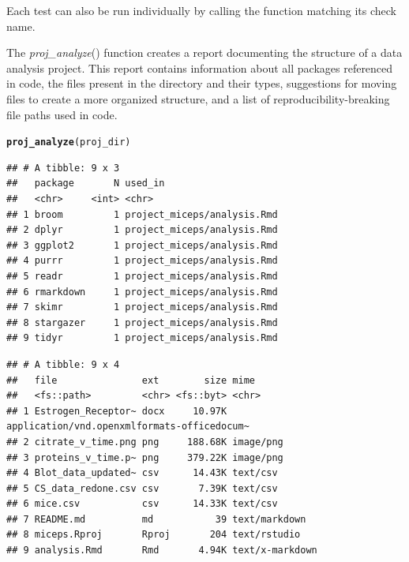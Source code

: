 \documentclass[APA,LATO1COL]{WileyNJD-v2}\usepackage[]{graphicx}\usepackage[]{color}
\makeatletter
\newcommand{\hlstd}[1]{\textcolor[rgb]{0.345,0.345,0.345}{#1}}%
\newcommand{\hlkwd}[1]{\textcolor[rgb]{0.737,0.353,0.396}{\textbf{#1}}}%
\newenvironment{kframe}{%
 \def\at@end@of@kframe{}%
 \ifinner\ifhmode%
  \def\at@end@of@kframe{\end{minipage}}%
  \begin{minipage}{\columnwidth}%
 \fi\fi%
 \def\FrameCommand##1{\hskip\@totalleftmargin \hskip-\fboxsep
 \colorbox{shadecolor}{##1}\hskip-\fboxsep
     \hskip-\linewidth \hskip-\@totalleftmargin \hskip\columnwidth}%
 \MakeFramed {\advance\hsize-\width
   \@totalleftmargin\z@ \linewidth\hsize
   \@setminipage}}%
 {\par\unskip\endMakeFramed%
 \at@end@of@kframe}
\newenvironment{knitrout}{}{} %
\newcommand{\func}[1]{\textit{#1}()}
\makeatother
\begin{document}
Each test can also be run individually by calling the function matching its check name.

The \func{proj\_analyze} function creates a report documenting the structure of a data analysis project. This report contains information about all packages referenced in code, the files present in the directory and their types, suggestions for moving files to create a more organized structure, and a list of reproducibility-breaking file paths used in code.

\begin{knitrout}
\color{fgcolor}\begin{kframe}
\begin{alltt}
\hlkwd{proj_analyze}\hlstd{(proj_dir)}
\end{alltt}


{\ttfamily\noindent\itshape\color{messagecolor}{\#\# -- Analysis of reproducibility for project\_miceps ---------------------- fertile 0.0.0.9028 --}}

{\ttfamily\noindent\itshape\color{messagecolor}{\#\# --\ \  Packages referenced in source code -------------------------------- fertile 0.0.0.9028 --}}\begin{verbatim}
## # A tibble: 9 x 3
##   package       N used_in                    
##   <chr>     <int> <chr>                      
## 1 broom         1 project_miceps/analysis.Rmd
## 2 dplyr         1 project_miceps/analysis.Rmd
## 3 ggplot2       1 project_miceps/analysis.Rmd
## 4 purrr         1 project_miceps/analysis.Rmd
## 5 readr         1 project_miceps/analysis.Rmd
## 6 rmarkdown     1 project_miceps/analysis.Rmd
## 7 skimr         1 project_miceps/analysis.Rmd
## 8 stargazer     1 project_miceps/analysis.Rmd
## 9 tidyr         1 project_miceps/analysis.Rmd
\end{verbatim}


{\ttfamily\noindent\itshape\color{messagecolor}{\#\# --\ \  Files present in directory ---------------------------------------- fertile 0.0.0.9028 --}}\begin{verbatim}
## # A tibble: 9 x 4
##   file               ext        size mime                                       
##   <fs::path>         <chr> <fs::byt> <chr>                                      
## 1 Estrogen_Receptor~ docx     10.97K application/vnd.openxmlformats-officedocum~
## 2 citrate_v_time.png png     188.68K image/png                                  
## 3 proteins_v_time.p~ png     379.22K image/png                                  
## 4 Blot_data_updated~ csv      14.43K text/csv                                   
## 5 CS_data_redone.csv csv       7.39K text/csv                                   
## 6 mice.csv           csv      14.33K text/csv                                   
## 7 README.md          md           39 text/markdown                              
## 8 miceps.Rproj       Rproj       204 text/rstudio                               
## 9 analysis.Rmd       Rmd       4.94K text/x-markdown
\end{verbatim}



\end{kframe}
\end{knitrout}
\end{document}
